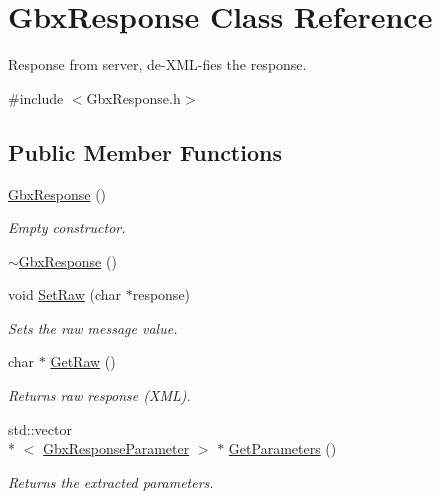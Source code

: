 \hypertarget{classGbxResponse}{\section{Gbx\-Response Class Reference}
\label{classGbxResponse}
}


Response from server, de-\/\-X\-M\-L-\/fies the response.  




{\ttfamily \#include $<$Gbx\-Response.\-h$>$}

\subsection*{Public Member Functions}
\begin{DoxyCompactItemize}
\item 
\hyperlink{classGbxResponse_ae29114aa0014ca50f3be6455bda1be47}{Gbx\-Response} ()
\begin{DoxyCompactList}\small\item\em Empty constructor. \end{DoxyCompactList}\item 
\hyperlink{classGbxResponse_a27e6c9c3452f2a0c90a33177af84236b}{$\sim$\-Gbx\-Response} ()
\item 
void \hyperlink{classGbxResponse_aadd25f4d4c454bb837af9b442742ff70}{Set\-Raw} (char $\ast$response)
\begin{DoxyCompactList}\small\item\em Sets the raw message value. \end{DoxyCompactList}\item 
char $\ast$ \hyperlink{classGbxResponse_a3311b30d7e04c2a14eb5f675ad6e37cd}{Get\-Raw} ()
\begin{DoxyCompactList}\small\item\em Returns raw response (X\-M\-L). \end{DoxyCompactList}\item 
std\-::vector\\*
$<$ \hyperlink{classGbxResponseParameter}{Gbx\-Response\-Parameter} $>$ $\ast$ \hyperlink{classGbxResponse_a9323a43f94e895422a7ee29a1eb80cc3}{Get\-Parameters} ()
\begin{DoxyCompactList}\small\item\em Returns the extracted parameters. \end{DoxyCompactList}\end{DoxyCompactItemize}
